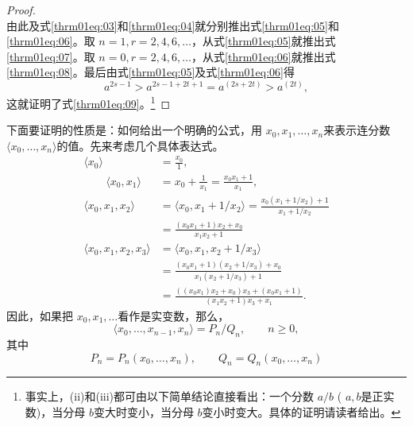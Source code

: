 \begin{proof}
\begin{equation*}
	\end{equation*}
	由此及式\eqref{thrm01eq:03}和\eqref{thrm01eq:04}就分别推出式\eqref{thrm01eq:05}和\eqref{thrm01eq:06}。取 \( n=1,
	r=2,4,6,\dots \)，从式\eqref{thrm01eq:05}就推出式\eqref{thrm01eq:07}。取 \( n=0, r=2,4,6,\dots
	\)，从式\eqref{thrm01eq:06}就推出式\eqref{thrm01eq:08}。最后由式\eqref{thrm01eq:05}及式\eqref{thrm01eq:06}得
	\begin{equation*}
		a^{2s-1} > a^{2s-1 + 2t + 1} = a^{(2s+2t)}  > a^{(2t)},
	\end{equation*}
	这就证明了式\eqref{thrm01eq:09}。\footnote{事实上，(ii)和(iii)都可由以下简单结论直接看出：一个分数 \( a / b \)
		( \( a, b \)是正实数)，当分母 \( b \)变大时变小，当分母 \( b \)变小时变大。具体的证明请读者给出。}
\end{proof}
下面要证明的性质是：如何给出一个明确的公式，用 \( x_0, x_1, \dots, x_n \)来表示连分数 \( \langle x_0, \dots, x_n \rangle
\)的值。先来考虑几个具体表达式。
\begin{align*}
	\langle x_0 \rangle                & = \frac{x_0}{1},                                                              \\
	\qquad \langle x_0, x_1 \rangle    & = x_0 + \frac{1}{x_1} = \frac{x_0x_1+1}{x_1},                                 \\
	\langle x_0, x_1, x_2 \rangle      & = \langle x_0, x_1 + 1/x_2 \rangle = \frac{x_0(x_1 + 1/x_2) + 1}{x_1 + 1/x_2} \\
	                                   & = \frac{(x_0x_1 + 1)x_2 + x_0}{x_1 x_2 + 1}                                   \\
	\langle x_0, x_1, x_2, x_3 \rangle & = \langle x_0, x_1, x_2 +  1/x_3 \rangle                                      \\
	                                   & = \frac{(x_0 x_1 + 1)(x_2 + 1 / x_3) + x_0}{x_1(x_2 + 1/x_3) + 1}             \\
	                                   & = \frac{((x_0 x_1)x_2 + x_0)x_3 + (x_0 x_1 + 1)}{(x_1 x_2 + 1)x_3 + x_1}.
\end{align*}
因此，如果把 \( x_0, x_1, \dots \)看作是实变数，那么，
\begin{equation}\label{eq:渐进分数}
	\langle x_0, \dots, x_{n-1}, x_n \rangle = P_n / Q_n, \qquad n \geqslant 0,
\end{equation}
其中
\begin{equation}\label{eq:递推函数形式}
	P_n = P_n(x_0, \dots, x_n), \qquad Q_n = Q_n(x_0, \dots, x_n)
\end{equation}
